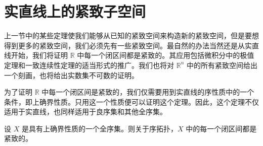 \section{实直线上的紧致子空间}\label{section:ch03-compact-subspaces-real}

上一节中的某些定理使我们能够从已知的紧致空间来构造新的紧致空间，但是要想得到更多的紧致空间，我们必须先有一些紧致空间。最自然的办法当然还是从实直线开始，我们将证明 $\mathbb{R}$ 中每一个闭区间都是紧致的。其应用包括微积分中的极值定理和一致连续性定理的适当形式的推广。我们也将对 $\mathbb{R}^{n}$ 中的所有紧致空间给出一个刻画，也将给出实数集不可数的证明。

为了证明 $\mathbb{R}$ 中每一个闭区间是紧致的，我们仅需要用到实直线的序性质中的一个条件，即上确界性质。只用这一个性质便可以证明这个定理。因此，这个定理不仅适用于实直线，也同样适用于良序集和其他全序集。

\begin{theorem}\label{theorem:ch03-lots-interval-compact}
设 $X$ 是具有上确界性质的一个全序集。则关于序拓扑，$X$ 中的每一个闭区间都是紧致的。
\end{theorem}

